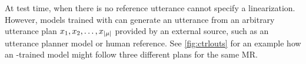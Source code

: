 At test time, when there is no reference utterance 
cannot specify a linearization. However, models trained with 
can generate an  utterance from an arbitrary utterance plan
$x_1, x_2, \ldots, x_{{\lvert \mu \rvert}}$ 
provided by an external source, such as an utterance planner model or human 
reference. {\color{red}See \autoref{fig:ctrlouts} for an example how an -trained model might follow three different plans for the same MR.}



